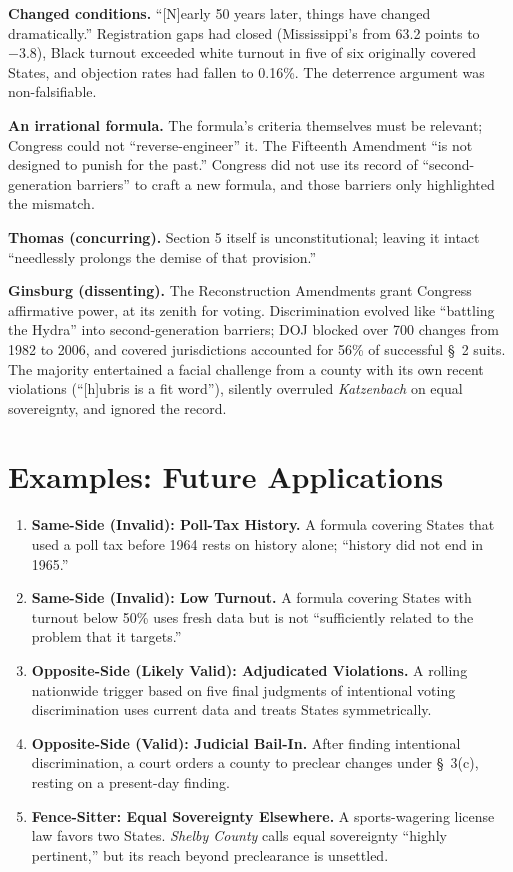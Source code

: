 \documentclass[12pt]{article}
\begin{document}
\textbf{Changed conditions.} ``[N]early 50 years later, things have changed dramatically.'' Registration gaps had closed (Mississippi's from 63.2 points to $-3.8$), Black turnout exceeded white turnout in five of six originally covered States, and objection rates had fallen to 0.16\%. The deterrence argument was non-falsifiable.

\textbf{An irrational formula.} The formula's criteria themselves must be relevant; Congress could not ``reverse-engineer'' it. The Fifteenth Amendment ``is not designed to punish for the past.'' Congress did not use its record of ``second-generation barriers'' to craft a new formula, and those barriers only highlighted the mismatch.

\textbf{Thomas (concurring).} Section 5 itself is unconstitutional; leaving it intact ``needlessly prolongs the demise of that provision.''

\textbf{Ginsburg (dissenting).} The Reconstruction Amendments grant Congress affirmative power, at its zenith for voting. Discrimination evolved like ``battling the Hydra'' into second-generation barriers; DOJ blocked over 700 changes from 1982 to 2006, and covered jurisdictions accounted for 56\% of successful \S~2 suits. The majority entertained a facial challenge from a county with its own recent violations (``[h]ubris is a fit word''), silently overruled \textit{Katzenbach} on equal sovereignty, and ignored the record.

\section{Examples: Future Applications}

\begin{enumerate}
\item \textbf{Same-Side (Invalid): Poll-Tax History.} A formula covering States that used a poll tax before 1964 rests on history alone; ``history did not end in 1965.''
\item \textbf{Same-Side (Invalid): Low Turnout.} A formula covering States with turnout below 50\% uses fresh data but is not ``sufficiently related to the problem that it targets.''
\item \textbf{Opposite-Side (Likely Valid): Adjudicated Violations.} A rolling nationwide trigger based on five final judgments of intentional voting discrimination uses current data and treats States symmetrically.
\item \textbf{Opposite-Side (Valid): Judicial Bail-In.} After finding intentional discrimination, a court orders a county to preclear changes under \S~3(c), resting on a present-day finding.
\item \textbf{Fence-Sitter: Equal Sovereignty Elsewhere.} A sports-wagering license law favors two States. \textit{Shelby County} calls equal sovereignty ``highly pertinent,'' but its reach beyond preclearance is unsettled.
\end{enumerate}
\end{document}
